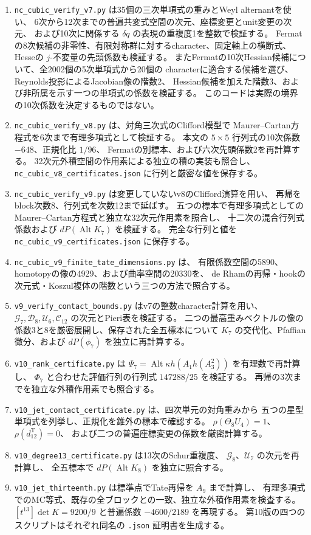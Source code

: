 \documentclass[a4paper,11pt]{ltjsarticle}
\theoremstyle{definition}
\begin{document}
\begin{enumerate}
 係数行列は全5005行・35列を対象とし、零でない660行を疎形式で保持する。
 \item \texttt{nc\_cubic\_verify\_v7.py} は35個の三次単項式の重みとWeyl alternantを使い、
 6次から12次までの普遍共変式空間の次元、座標変更とunit変更の次元、
 および10次に関係する $\delta q$ の表現の重複度1を整数で検証する。
 Fermatの8次候補の非零性、有限対称群に対するcharacter、固定軸上の横断式、
 Hesseの $j$-不変量の先頭係数も検証する。
 またFermatの10次Hessian候補について、全2002個の5次単項式から20個の
 characterに適合する候補を選び、Reynolds投影によるJacobian像の階数2、
 Hessian候補を加えた階数3、および非所属を示す一つの単項式の係数を検証する。
 このコードは実際の境界の10次係数を決定するものではない。
 \item \texttt{nc\_cubic\_verify\_v8.py} は、対角三次式のClifford模型で
 Maurer--Cartan方程式を6次まで有理多項式として検証する。
 本文の $5\times5$ 行列式の10次係数 $-648$、正規化比 $1/96$、
 Fermatの別標本、および六次先頭係数2を再計算する。
 32次元外積空間の作用素による独立の積の実装も照合し、
 \texttt{nc\_cubic\_v8\_certificates.json} に行列と厳密な値を保存する。
 \item \texttt{nc\_cubic\_verify\_v9.py} は変更していないv8のClifford演算を用い、
 再帰をblock次数8、行列式を次数12まで延ばす。
 五つの標本で有理多項式としてのMaurer--Cartan方程式と独立な32次元作用素を照合し、
 十二次の混合行列式係数および $dP(\operatorname{Alt}K_7)$ を検証する。
 完全な行列と値を \texttt{nc\_cubic\_v9\_certificates.json} に保存する。
 \item \texttt{nc\_cubic\_v9\_finite\_tate\_dimensions.py} は、
 有限係数空間の5890、homotopyの像の4929、および曲率空間の20330を、
 de Rhamの再帰・hookの次元式・Koszul複体の階数という三つの方法で照合する。
 \item \texttt{v9\_verify\_contact\_bounds.py} はv7の整数character計算を用い、
 $\mathcal G_7,\mathcal D_8,\mathcal U_6,\mathcal C_{12}$ の次元とPieri表を検証する。
 二つの最高重みベクトルの像の係数3と8を厳密展開し、保存された全五標本について
 $K_7$ の交代化、Pfaffian微分、および $dP(\phi_7)$ を独立に再計算する。
 \item \texttt{v10\_rank\_certificate.py} は
 $\Psi_7=\operatorname{Alt}\kappa h(A_1h(A_3^2))$ を有理数で再計算し、
 $\Phi_7$ と合わせた評価行列の行列式 $147288/25$ を検証する。
 再帰の3次までを独立な外積作用素でも照合する。
 \item \texttt{v10\_jet\_contact\_certificate.py} は、四次単元の対角重みから
 五つの星型単項式を列挙し、正規化を錐外の標本で確認する。
 $\rho(\Theta_8U_4)=1$、$\rho(d^{\mathrm T}_{12})=0$、
 および二つの普遍座標変更の係数を厳密計算する。
 \item \texttt{v10\_degree13\_certificate.py} は13次のSchur重複度、
 $\mathcal G_8$、$\mathcal U_7$ の次元を再計算し、
 全五標本で $dP(\operatorname{Alt}K_8)$ を独立に照合する。
 \item \texttt{v10\_jet\_thirteenth.py} は標準点でTate再帰を $A_9$ まで計算し、
 有理多項式でのMC等式、既存の全ブロックとの一致、独立な外積作用素を検査する。
 $[t^{13}]\det K=9200/9$ と普遍係数 $-4600/2189$ を再現する。
 第10版の四つのスクリプトはそれぞれ同名の \texttt{.json} 証明書を生成する。


\end{enumerate}
\end{document}
